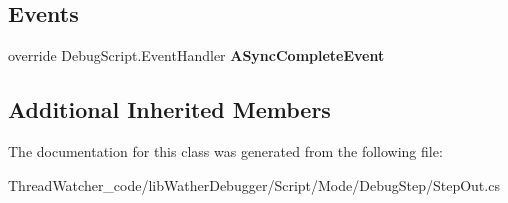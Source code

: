 \subsection*{Events}
\begin{DoxyCompactItemize}
\item 
\hypertarget{classlib_wather_debugger_1_1_script_1_1_mode_1_1_debug_step_1_1_step_out_a4b22fb63ea395bc0fa01d850efe3d301}{override Debug\+Script.\+Event\+Handler {\bfseries A\+Sync\+Complete\+Event}}\label{classlib_wather_debugger_1_1_script_1_1_mode_1_1_debug_step_1_1_step_out_a4b22fb63ea395bc0fa01d850efe3d301}

\end{DoxyCompactItemize}
\subsection*{Additional Inherited Members}


The documentation for this class was generated from the following file\+:\begin{DoxyCompactItemize}
\item 
Thread\+Watcher\+\_\+code/lib\+Wather\+Debugger/\+Script/\+Mode/\+Debug\+Step/Step\+Out.\+cs\end{DoxyCompactItemize}
